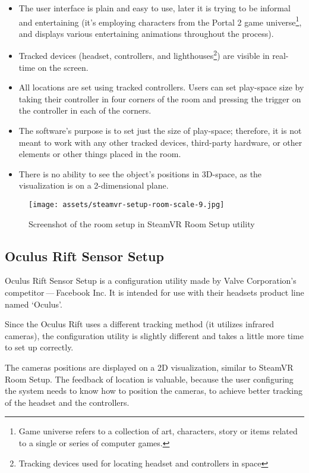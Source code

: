 \begin{itemize}
    \itemsep0em
\item The user interface is plain and easy to use, later it is trying to be informal
and entertaining (it’s employing characters from the Portal 2 game universe\footnote{Game universe refers to a collection of art, characters, story or items related to a single or series of computer games.},
and displays various entertaining animations throughout the process).
\item Tracked devices (headset, controllers, and lighthouses\footnote{Tracking 
devices used for locating headset and controllers in space}) are visible in real-time on the screen.
\item All locations are set using tracked controllers. Users can set play-space
size by taking their controller in four corners of the room and pressing
the trigger on the controller in each of the corners.
\item The software’s purpose is to set just the size of play-space; therefore, it is not
meant to work with any other tracked devices, third-party hardware, or other elements or
other things placed in the room.
\item There is no ability to see the object’s positions in 3D-space, as the visualization is
on a 2-dimensional plane.
\end{itemize}

\begin{figure}[h]{}
    \centering\texttt{[image: assets/steamvr-setup-room-scale-9.jpg]}
    \caption{Screenshot of the room setup in SteamVR Room Setup utility}
    \end{figure}
    
\hypertarget{x-oculus-rift-sensor-setup}{\subsection{Oculus Rift Sensor Setup}}
Oculus Rift Sensor Setup is a configuration utility made by Valve Corporation’s
competitor — Facebook Inc. It is intended for use with their headsets
product line named `Oculus'.

Since the Oculus Rift uses a different tracking method (it utilizes infrared cameras),
the configuration utility is slightly different and takes a little more
time to set up correctly.

The cameras positions are displayed on a 2D visualization, similar
to SteamVR Room Setup. The feedback of location is valuable, because the
user configuring the system needs to know how to position the
cameras, to achieve better tracking of the headset and the controllers.

